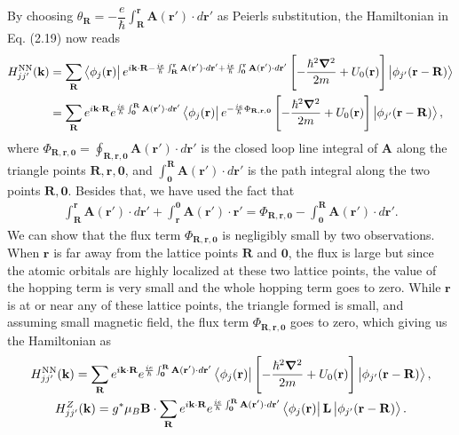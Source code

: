 \documentclass{report}
\newcommand{\f}[2]{\dfrac{#1}{#2}}
\begin{document}
By choosing $\theta_{\mathbf{R}} = - \f{e}{\hbar} \int_{\mathbf{R}}^{\mathbf{r}} \mathbf{A(\mathbf{r'})} \cdot d\mathbf{r'}$ as Peierls substitution, the Hamiltonian in Eq. (2.19) now reads
\begin{equation}
	\begin{aligned}
		H_{jj'}^{\text{NN}}(\mathbf{k})
		 & = \sum_{\mathbf{R}} \bra{\phi_{j}(\mathbf{r})} e^{i\mathbf{k \cdot R} - \frac{ie}{\hbar} \int_{\mathbf{R}}^{\mathbf{r}} \mathbf{A}(\mathbf{r'}) \cdot d\mathbf{r'} + \frac{ie}{\hbar}\int_{\mathbf{0}}^{\mathbf{r}}\mathbf{A(\mathbf{r'})}\cdot d\mathbf{r'} } \left[- \f{\hbar^{2} \boldsymbol{\nabla}^{2}}{2m} + U_{0} (\mathbf{r}) \right] \ket{\phi_{j'}(\mathbf{r - R})} \\
		 & = \sum_{\mathbf{R}}  e^{i\mathbf{k \cdot R}} e^{\frac{ie}{\hbar} \int_{\mathbf{0}}^{\mathbf{R}} \mathbf{A(\mathbf{r'})} \cdot d \mathbf{r'} } \bra{\phi_{j}(\mathbf{r})} e^{-\frac{ie}{\hbar} \Phi_{\mathbf{R,r,0}}} \left[ -\f{\hbar^{2} \boldsymbol{\nabla}^{2}}{2m} + U_{0} (\mathbf{r}) \right] \ket{\phi_{j'}(\mathbf{r - R})},
	\end{aligned}
\end{equation}
where $\Phi_{\mathbf{R,r,0}} = \oint_{\mathbf{R,r,0}} \mathbf{A(\mathbf{r'})} \cdot d\mathbf{r'} $ is the closed loop line integral of $\mathbf{A}$ along the triangle points $\mathbf{R,r,0}$, and $\int_{\mathbf{0}}^{\mathbf{R}} \mathbf{A(\mathbf{r'})} \cdot d \mathbf{r'}$ is the path integral along the two points $\mathbf{R,0}$. Besides that, we have used the fact that
\begin{align}
	\int_{\mathbf{R}}^{\mathbf{r}} \mathbf{A(\mathbf{r'})} \cdot d\mathbf{r'} + \int_{\mathbf{r}}^{\mathbf{0}} \mathbf{A(r')} \cdot \mathbf{r'} = \Phi_{\mathbf{R,r,0}} - \int_{\mathbf{0}}^{\mathbf{R}} \mathbf{A(\mathbf{r'})} \cdot d \mathbf{r'}.
\end{align}
We can show that the flux term $\Phi_{\mathbf{R,r,0}}$ is negligibly small \cite{yalcin_2019} by two observations. When $\mathbf{r}$ is far away from the lattice points $\mathbf{R}$ and $\mathbf{0}$, the flux is large but since the atomic orbitals are highly localized at these two lattice points, the value of the hopping term is very small and the whole hopping term goes to zero. While $\mathbf{r}$ is at or near any of these lattice points, the triangle formed is small, and assuming small magnetic field, the flux term $\Phi_{\mathbf{R,r,0}}$ goes to zero, which giving us the Hamiltonian as
\begin{gather}
	H_{jj'}^{\text{NN}}(\mathbf{k})
	= \sum_{\mathbf{R}} e^{i\mathbf{k \cdot R}}e^{\frac{ie}{\hbar} \int_{\mathbf{0}}^{\mathbf{R}} \mathbf{A(\mathbf{r'})} \cdot d \mathbf{r'} } \bra{\phi_{j}(\mathbf{r})} \left[ -\f{\hbar^{2} \boldsymbol{\nabla}^{2}}{2m} + U_{0} (\mathbf{r}) \right] \ket{\phi_{j'}(\mathbf{r - R})},\\
	H_{jj'}^{Z}(\mathbf{k})
	= g^{*} \mu_{B} \mathbf{B} \cdot \sum_{\mathbf{R}} e^{i\mathbf{k \cdot R}}e^{\frac{ie}{\hbar} \int_{\mathbf{0}}^{\mathbf{R}} \mathbf{A(\mathbf{r'})} \cdot d \mathbf{r'}} \bra{\phi_{j}(\mathbf{r})} \mathbf{L} \ket{\phi_{j'}(\mathbf{r - R})}.
\end{gather}
\end{document}
